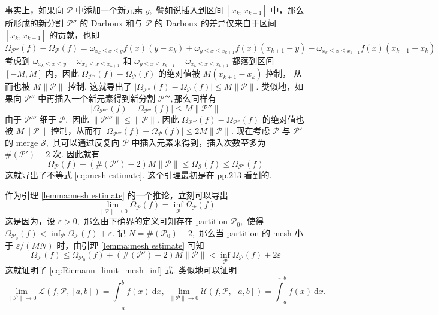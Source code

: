 \documentclass[12pt, a4paper, oneside]{book}
\numberwithin{figure}{section}
\theoremstyle{definition}
\begin{document}
事实上，如果向 $\mathcal P$ 中添加一个新元素 $y,$ 譬如说插入到区间 $[x_k,x_{k+1}]$ 中，那么所形成的新分割 $\mathcal P''$ 的 Darboux 和与 $\mathcal P$ 的 Darboux 的差异仅来自于区间 $[x_k,x_{k+1}]$ 的贡献，也即
\begin{equation}
    \Omega_{\mathcal P''}(f)-\Omega_{\mathcal P}(f)=\omega_{x_k\leq x\leq y}f(x) (y-x_k)+ \omega_{y\leq x\leq x_{k+1}}f(x) (x_{k+1}-y) - \omega_{x_k\leq x\leq x_{k+1}}f(x) (x_{k+1}-x_k)
\end{equation}
考虑到 $\omega_{x_k\leq x\leq y}-\omega_{x_k\leq x\leq x_{k+1}}$ 和 $\omega_{y\leq x\leq x_{k+1}}-\omega_{x_k\leq x\leq x_{k+1}}$ 都落到区间 $[-M,M]$ 内，因此 $\Omega_{\mathcal P''}(f)-\Omega_{\mathcal P}(f)$ 的绝对值被 $M(x_{k+1}-x_k)$ 控制， 
从而也被 $M\|\mathcal P\|$ 控制. 这就导出了 $|\Omega_{\mathcal P''}(f)-\Omega_{\mathcal P}(f)|\leq M\|\mathcal P\|.$ 类似地，如果向 $\mathcal P''$ 中再插入一个新元素得到新分割 $\mathcal P''',$那么同样有
\begin{equation}
    |\Omega_{\mathcal P'''}(f)-\Omega_{\mathcal P''}(f)|\leq M\|\mathcal P''\|
\end{equation}
由于 $\mathcal P'''$ 细于 $\mathcal P,$ 因此 $\|\mathcal P'''\|\leq \|\mathcal P\|.$ 因此 $\Omega_{\mathcal P'''}(f)-\Omega_{\mathcal P''}(f)$ 的绝对值也被 $M\|\mathcal P\|$ 控制，从而有 $|\Omega_{\mathcal P'''}(f)-\Omega_{\mathcal P}(f)|\leq 2 M\|\mathcal P\|.$ 
现在考虑 $\mathcal P$ 与 $\mathcal P'$ 的 merge $\mathcal S,$ 其可以通过反复向 $\mathcal P$ 中插入元素来得到，插入次数至多为 $ \#(\mathcal P')-2$ 次. 因此就有
\begin{equation}
    \Omega_{\mathcal P}(f)-(\#(\mathcal P')-2)M\|\mathcal P\|\leq \Omega_{\mathcal S}(f)\leq \Omega_{\mathcal P'}(f)
\end{equation}
这就导出了不等式 \eqref{eq:mesh estimate}. 这个引理最初是在 \cite{Mei_2011} pp.213 看到的.

作为引理 \ref{lemma:mesh estimate} 的一个推论，立刻可以导出
\begin{equation}\label{eq:Riemann_limit_mesh_inf}
    \lim_{\|\mathcal P\|\to 0} \Omega_{\mathcal P}(f)=\inf_{\mathcal P}\Omega_{\mathcal P}(f)
\end{equation}
这是因为，设 $\varepsilon>0,$ 那么由下确界的定义可知存在 partition $\mathcal P_0,$ 使得 $\Omega_{\mathcal P_0}(f)<\inf_{\mathcal P}\Omega_{\mathcal P}(f)+\varepsilon.$ 
记 $N=\#(\mathcal P_0)-2,$ 那么当 partition 的 mesh 小于 $\varepsilon/(MN)$ 时，由引理 \ref{lemma:mesh estimate} 可知
\begin{equation}
    \Omega_{\mathcal P}(f)\leq\Omega_{\mathcal P_0}(f)+(\#(\mathcal P')-2)M\|\mathcal P\|<\inf_{\mathcal P}\Omega_{\mathcal P}(f)+2\varepsilon
\end{equation}
这就证明了 \eqref{eq:Riemann_limit_mesh_inf} 式. 类似地可以证明
\begin{equation}\label{eq:Riemann_limit_mesh_upper_lower}
    \lim_{\|\mathcal P\|\to 0} \mathcal L(f,\mathcal P,[a,b])=\underline{\int}_a^b f(x)\ \mathrm dx,\ \lim_{\|\mathcal P\|\to 0} \mathcal U(f,\mathcal P,[a,b])=\overline{\int}_a^b f(x)\ \mathrm dx.
\end{equation}
\end{document}
